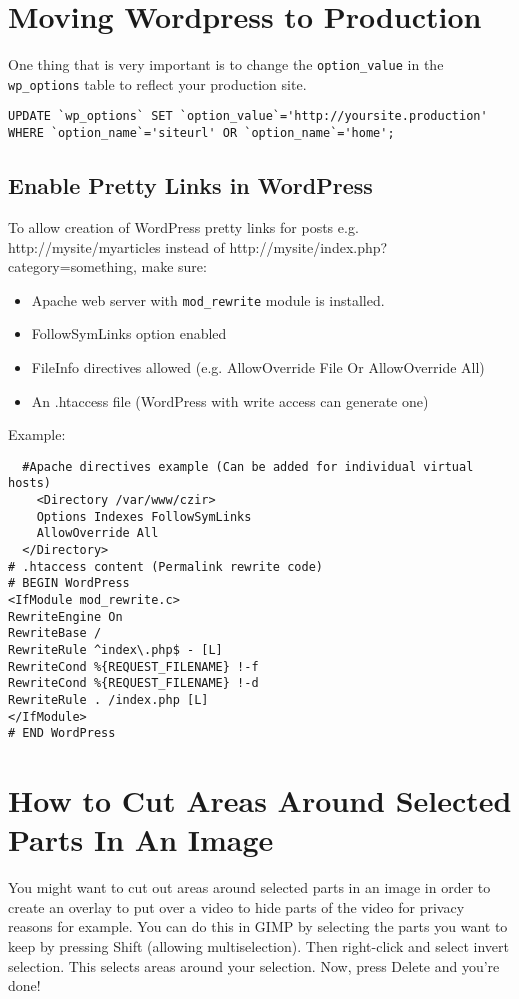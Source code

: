 \documentclass{article}
\begin{document}
\section{Moving Wordpress to Production}
One thing that is very important is to change the \lstinline{option_value} in the \lstinline{wp_options} table to reflect your production site.  

\begin{verbatim}
UPDATE `wp_options` SET `option_value`='http://yoursite.production' WHERE `option_name`='siteurl' OR `option_name`='home';
\end{verbatim}

\subsection{Enable Pretty Links in WordPress}
To allow creation of WordPress pretty links for posts e.g. http://mysite/myarticles instead of http://mysite/index.php?category=something, make sure: 
\begin{itemize}
  \item Apache web server with \lstinline{mod_rewrite} module is installed. 
  \item FollowSymLinks option enabled 
  \item FileInfo directives allowed (e.g. AllowOverride File Or AllowOverride All)
  \item An .htaccess file (WordPress with write access can generate one)
\end{itemize}

Example: 
\begin{lstlisting}
  #Apache directives example (Can be added for individual virtual hosts)
    <Directory /var/www/czir>
    Options Indexes FollowSymLinks
    AllowOverride All
  </Directory>
# .htaccess content (Permalink rewrite code)
# BEGIN WordPress
<IfModule mod_rewrite.c>
RewriteEngine On
RewriteBase /
RewriteRule ^index\.php$ - [L]
RewriteCond %{REQUEST_FILENAME} !-f
RewriteCond %{REQUEST_FILENAME} !-d
RewriteRule . /index.php [L]
</IfModule>
# END WordPress
\end{lstlisting}


\section{How to Cut Areas Around Selected Parts In An Image}
You might want to cut out areas around selected parts in an image in order to create an overlay to put over a video to hide parts of the video for privacy reasons for example. You can do this in GIMP by selecting the parts you want to keep by pressing Shift (allowing multiselection). Then right-click and select invert selection. This selects areas around your selection. Now, press Delete 
and you're done!
\end{document}
